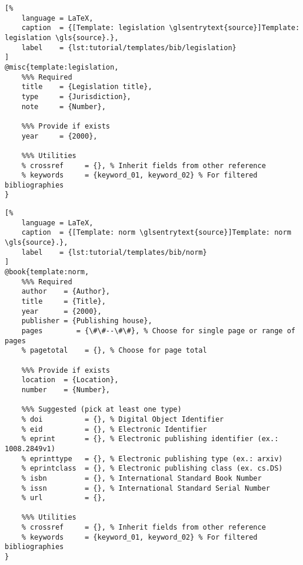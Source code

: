 \newpage
\begin{lstlisting}[%
    language = LaTeX,
    caption  = {[Template: legislation \glsentrytext{source}]Template: legislation \gls{source}.},
    label    = {lst:tutorial/templates/bib/legislation}
]
@misc{template:legislation,
    %%% Required
    title    = {Legislation title},
    type     = {Jurisdiction},
    note     = {Number},
    
    %%% Provide if exists
    year     = {2000},
    
    %%% Utilities
    % crossref     = {}, % Inherit fields from other reference
    % keywords     = {keyword_01, keyword_02} % For filtered bibliographies
}
\end{lstlisting}

\begin{lstlisting}[%
    language = LaTeX,
    caption  = {[Template: norm \glsentrytext{source}]Template: norm \gls{source}.},
    label    = {lst:tutorial/templates/bib/norm}
]
@book{template:norm,
    %%% Required
    author    = {Author},
    title     = {Title},
    year      = {2000},
    publisher = {Publishing house},
    pages        = {\#\#--\#\#}, % Choose for single page or range of pages
    % pagetotal    = {}, % Choose for page total
    
    %%% Provide if exists
    location  = {Location},
    number    = {Number},
    
    %%% Suggested (pick at least one type)
    % doi          = {}, % Digital Object Identifier
    % eid          = {}, % Electronic Identifier
    % eprint       = {}, % Electronic publishing identifier (ex.: 1008.2849v1)
    % eprinttype   = {}, % Electronic publishing type (ex.: arxiv)
    % eprintclass  = {}, % Electronic publishing class (ex. cs.DS)
    % isbn         = {}, % International Standard Book Number
    % issn         = {}, % International Standard Serial Number
    % url          = {},
    
    %%% Utilities
    % crossref     = {}, % Inherit fields from other reference
    % keywords     = {keyword_01, keyword_02} % For filtered bibliographies
}
\end{lstlisting}